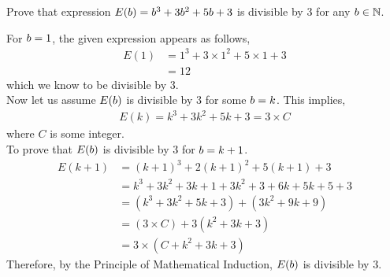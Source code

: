 

\question[3] Prove that expression $E(b) = b^3+3b^2+5b+3$ 
is divisible by $3$ for any $b\in\mathbb{N}$.

\watchout

\ifprintanswers
\fi

\begin{solution}[\fullpage]
  For $b=1$, the given expression appears as follows,
  \begin{align}
    E(1) &= 1^3 + 3\times 1^2 + 5\times 1 + 3 \\
         &= 12
  \end{align}
  which we know to be divisible by $3$.\\
  Now let us assume $E(b)$ is divisible by $3$ for some 
  $b=k$. This implies,
  \begin{align}
    E(k) = k^3+3k^2+5k+3 = 3\times C
  \end{align}
  where $C$ is some integer.\\
  To prove that $E(b)$ is divisible by $3$ for $b=k+1$.
  \begin{align}
    E(k+1) &= (k+1)^3+2(k+1)^2+5(k+1)+3 \\
           &= k^3+3k^2+3k+1+3k^2+3+6k+5k+5+3 \\
           &= (k^3+3k^2+5k+3)+(3k^2+9k+9) \\
           &= (3\times C)+3(k^2+3k+3) \\
           &= 3\times (C+k^2+3k+3)
  \end{align}
  Therefore, by the Principle of Mathematical Induction, $E(b)$ is divisible by $3$.
  
\end{solution}

